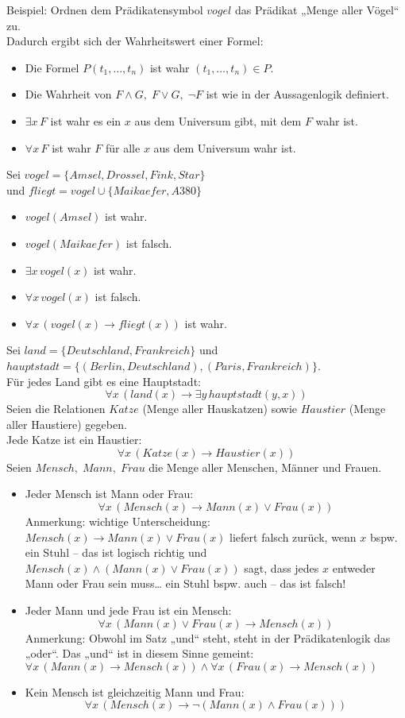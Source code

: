 Beispiel: Ordnen dem Prädikatensymbol $vogel$ das Prädikat „Menge aller Vögel“ zu.\\
Dadurch ergibt sich der Wahrheitswert einer Formel: 
\begin{itemize}
\item Die Formel $P(t_1, \dots, t_n)$ ist wahr \gdw{} $(t_1, \dots, t_n) \in P$.
\item Die Wahrheit von $F\wedge G, \; F\vee G,\; \neg F$ ist wie in der Aussagenlogik definiert.
\item $\exists x \, F$ ist wahr \gdw{} es ein $x$ aus dem Universum gibt, mit dem $F$ wahr ist.
\item $\forall x \, F$ ist wahr \gdw{} $F$ für alle $x$ aus dem Universum wahr ist.
\end{itemize}
Sei $vogel=\{Amsel, Drossel, Fink, Star\}$\\
und $fliegt=vogel \cup \{Maikaefer, A380\}$
\begin{itemize}
\item $vogel(Amsel)$ ist wahr.
\item $vogel(Maikaefer)$ ist falsch.
\item $\exists x \, vogel(x)$ ist wahr.
\item $\forall x \, vogel(x)$ ist falsch.
\item $\forall x \,(vogel(x) \to fliegt(x))$ ist wahr.
\end{itemize}

 Sei $land=\{Deutschland, Frankreich\}$ und \\
$hauptstadt = \{ (Berlin, Deutschland), (Paris, Frankreich) \}$.\\
Für jedes Land gibt es eine Hauptstadt:
$$\forall x \,(land(x)\to \exists y \, hauptstadt(y,x))$$
 Seien die Relationen $Katze$ (Menge aller Hauskatzen) sowie $Haustier$ (Menge aller Haustiere) gegeben.\\
Jede Katze ist ein Haustier:
$$\forall x \,(Katze (x) \to Haustier (x))$$
Seien $Mensch, \; Mann, \; Frau$ die Menge aller Menschen, Männer und Frauen.
\begin{itemize}
\item Jeder Mensch ist Mann oder Frau:
$$\forall x \, (Mensch(x) \to Mann(x) \vee Frau (x))$$
Anmerkung: wichtige Unterscheidung:\\
$Mensch(x) \to Mann(x) \vee Frau (x)$ liefert falsch zurück, wenn $x$ bspw. ein Stuhl -- das ist logisch richtig und \\
$Mensch(x) \wedge( Mann(x) \vee Frau (x))$ sagt, dass jedes $x$ entweder Mann oder Frau sein muss… ein Stuhl bspw. auch -- das ist falsch!
\item Jeder Mann und jede Frau ist ein Mensch:
$$\forall x \, (Mann(x) \vee Frau(x) \to Mensch(x))$$
Anmerkung: Obwohl im Satz „und“ steht, steht in der Prädikatenlogik das „oder“. Das „und“ ist in diesem Sinne gemeint:\\
$\forall x \, (Mann(x)\to Mensch(x)) \wedge \forall x\, (Frau(x) \to Mensch(x))$
\item Kein Mensch ist gleichzeitig Mann und Frau:
$$\forall x \, (Mensch(x) \to  \neg (Mann(x) \wedge Frau(x)))$$
\end{itemize}

